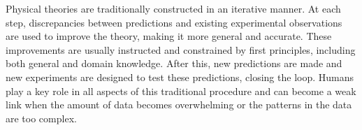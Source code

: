 \documentclass[
 reprint,
 amsmath,amssymb,
 aps,
]{revtex4-2}
\begin{document}

\maketitle




Physical theories are traditionally constructed in an iterative manner. At each step, discrepancies between predictions and existing experimental observations are used to improve the theory, making it more general and accurate. These improvements are usually instructed and constrained by first principles, including both general and domain knowledge. After this, new predictions are made and new experiments are designed to test these predictions, closing the loop. Humans play a key role in all aspects of this traditional procedure and can become a weak link when the amount of data becomes overwhelming or the patterns in the data are too complex. 
\end{document}
